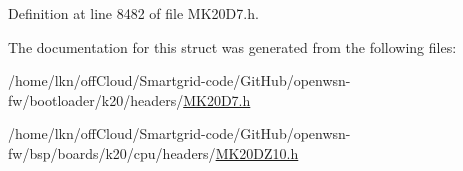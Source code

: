 Definition at line 8482 of file M\+K20\+D7.\+h.



The documentation for this struct was generated from the following files\+:\begin{DoxyCompactItemize}
\item 
/home/lkn/off\+Cloud/\+Smartgrid-\/code/\+Git\+Hub/openwsn-\/fw/bootloader/k20/headers/\hyperlink{bootloader_2k20_2headers_2_m_k20_d7_8h}{M\+K20\+D7.\+h}\item 
/home/lkn/off\+Cloud/\+Smartgrid-\/code/\+Git\+Hub/openwsn-\/fw/bsp/boards/k20/cpu/headers/\hyperlink{_m_k20_d_z10_8h}{M\+K20\+D\+Z10.\+h}\end{DoxyCompactItemize}
